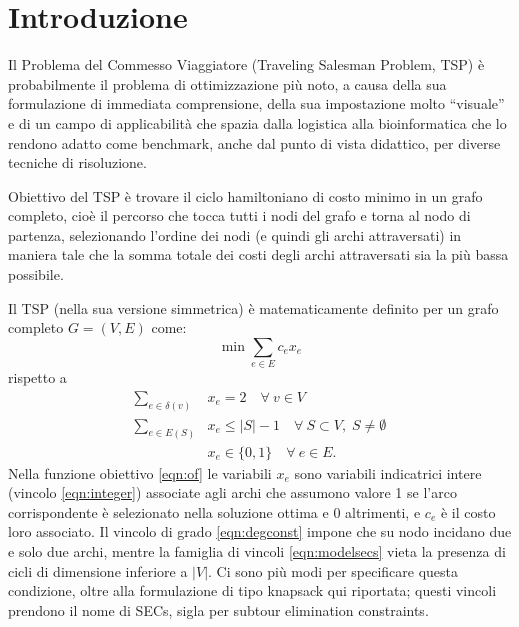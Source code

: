 \chapter{Introduzione}
Il Problema del Commesso Viaggiatore (Traveling Salesman Problem, TSP) è probabilmente il problema di ottimizzazione più noto, a causa della sua formulazione di immediata comprensione, della sua impostazione molto ``visuale'' e di un campo di applicabilità che spazia dalla logistica alla bioinformatica che lo rendono adatto come benchmark, anche dal punto di vista didattico, per diverse tecniche di risoluzione.

Obiettivo del TSP è trovare il ciclo hamiltoniano di costo minimo in un grafo completo, cioè il percorso che tocca tutti i nodi del grafo e torna al nodo di partenza, selezionando l'ordine dei nodi (e quindi gli archi attraversati) in maniera tale che la somma totale dei costi degli archi attraversati sia la più bassa possibile.

Il TSP (nella sua versione simmetrica) è matematicamente definito per un grafo completo $G = (V,E)$ come:
\begin{equation}
  \min \sum_{e \in E}c_ex_e \label{eqn:of}
\end{equation}
rispetto a
\begin{align}
  \sum_{e \in \delta(v)} & x_e = 2 \quad\forall\: v \in V \label{eqn:degconst}\\
  \sum_{e \in E(S)} & x_e \leq |S| - 1 \quad\forall\: S \subset V,\; S \neq \emptyset \label{eqn:modelsecs}\\
  & x_e \in \{0,1\}  \quad \forall\: e \in E. \label{eqn:integer}
\end{align}
Nella funzione obiettivo \ref{eqn:of} le variabili $x_e$ sono variabili indicatrici intere (vincolo \ref{eqn:integer}) associate agli archi che assumono valore 1 se l'arco corrispondente è selezionato nella soluzione ottima e 0 altrimenti, e $c_e$ è il costo loro associato. Il vincolo di grado \ref{eqn:degconst} impone che su nodo incidano due e solo due archi, mentre la famiglia di vincoli \ref{eqn:modelsecs} vieta la presenza di cicli di dimensione inferiore a $|V|$. Ci sono più modi per specificare questa condizione, oltre alla formulazione di tipo knapsack qui riportata; questi vincoli prendono il nome di SECs, sigla per subtour elimination constraints.

